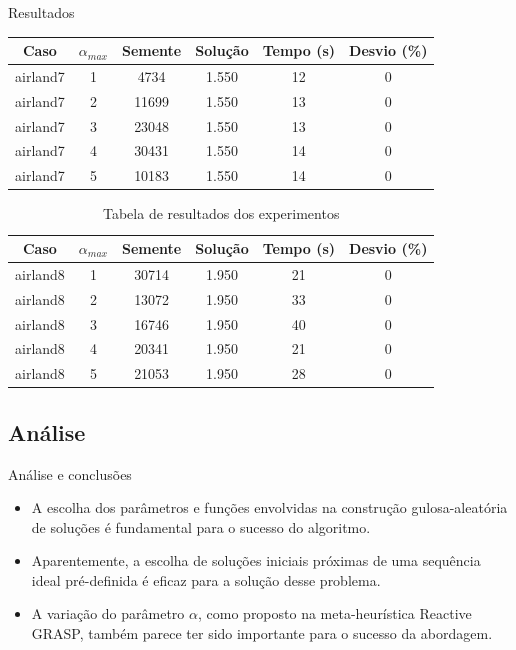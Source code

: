 \documentclass[xcolor=dvipsnames]{beamer}
\begin{document}
\begin{frame}[allowframebreaks]{Resultados}
\begin{table}
\begin{tabular}{|c|c|c|c|c|c|}
\hline %

Caso & $\alpha_{max}$ & Semente & Solução & Tempo (s) & Desvio (\%)  \\

\hline
airland7 & 1 & 4734 & 1.550 & 12 & 0 \\ 
airland7 & 2 & 11699 & 1.550 & 13 & 0 \\ 
airland7 & 3 & 23048 & 1.550 & 13 & 0 \\ 
airland7 & 4 & 30431 & 1.550 & 14 & 0 \\ 
airland7 & 5 & 10183 & 1.550 & 14 & 0 \\ 
\hline

\end{tabular}
\label{tab}
\end{table} 

\begin{table}

\centering

\caption{Tabela de resultados dos experimentos}

\begin{tabular}{|c|c|c|c|c|c|}

\hline %

Caso & $\alpha_{max}$ & Semente & Solução & Tempo (s) & Desvio (\%)  \\

\hline
airland8 & 1 & 30714 & 1.950 & 21 & 0 \\ 
airland8 & 2 & 13072 & 1.950 & 33 & 0 \\ 
airland8 & 3 & 16746 & 1.950 & 40 & 0 \\ 
airland8 & 4 & 20341 & 1.950 & 21 & 0 \\ 
airland8 & 5 & 21053 & 1.950 & 28 & 0 \\ 
\hline

\end{tabular}
\label{tab}
\end{table} 

\end{frame}

\subsection{Análise}

\begin{frame}{Análise e conclusões}
 \begin{itemize}[<+-| alert@+>]
  \item{A escolha dos parâmetros e funções envolvidas na construção gulosa-aleatória de soluções é fundamental para o sucesso do algoritmo.}
  \item{Aparentemente, a escolha de soluções iniciais próximas de uma sequência ideal pré-definida é eficaz para a solução desse problema.}
  \item{A variação do parâmetro $\alpha$, como proposto na meta-heurística Reactive GRASP, também parece ter sido importante para o sucesso da abordagem.}
 \end{itemize}  
\end{frame}
\end{document}
